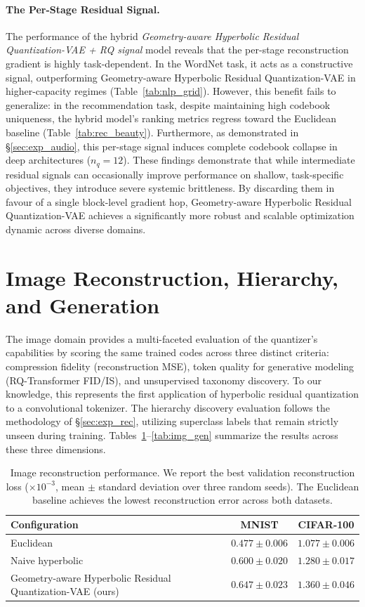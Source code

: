 \documentclass[12pt]{report}
\begin{document}
\paragraph{The Per-Stage Residual Signal.}
The performance of the hybrid \emph{Geometry-aware Hyperbolic Residual Quantization-VAE + RQ signal} model reveals that the per-stage reconstruction gradient is highly task-dependent. In the WordNet task, it acts as a constructive signal, outperforming Geometry-aware Hyperbolic Residual Quantization-VAE in higher-capacity regimes (Table~\ref{tab:nlp_grid}). However, this benefit fails to generalize: in the recommendation task, despite maintaining high codebook uniqueness, the hybrid model's ranking metrics regress toward the Euclidean baseline (Table~\ref{tab:rec_beauty}). Furthermore, as demonstrated in \S\ref{sec:exp_audio}, this per-stage signal induces complete codebook collapse in deep architectures ($n_q=12$). These findings demonstrate that while intermediate residual signals can occasionally improve performance on shallow, task-specific objectives, they introduce severe systemic brittleness. By discarding them in favour of a single block-level gradient hop, Geometry-aware Hyperbolic Residual Quantization-VAE achieves a significantly more robust and scalable optimization dynamic across diverse domains.

\section{Image Reconstruction, Hierarchy, and Generation}
\label{sec:exp_image}

The image domain provides a multi-faceted evaluation of the quantizer's capabilities by scoring the same trained codes across three distinct criteria: compression fidelity (reconstruction MSE), token quality for generative modeling (RQ-Transformer FID/IS), and unsupervised taxonomy discovery. To our knowledge, this represents the first application of hyperbolic residual quantization to a convolutional tokenizer. The hierarchy discovery evaluation follows the methodology of \S\ref{sec:exp_rec}, utilizing superclass labels that remain strictly unseen during training. Tables~\ref{tab:img_recon}--\ref{tab:img_gen} summarize the results across these three dimensions.

\begin{table}[h]
\centering
\caption{Image reconstruction performance. We report the best validation reconstruction loss ($\times10^{-3}$, mean $\pm$ standard deviation over three random seeds). The Euclidean baseline achieves the lowest reconstruction error across both datasets.}
\label{tab:img_recon}
\begin{tabular}{lcc}
\hline
Configuration & MNIST & CIFAR-100 \\
\hline
Euclidean & $\mathbf{0.477 \pm 0.006}$ & $\mathbf{1.077 \pm 0.006}$ \\
Naive hyperbolic & $0.600 \pm 0.020$ & $1.280 \pm 0.017$ \\
Geometry-aware Hyperbolic Residual Quantization-VAE (ours) & $0.647 \pm 0.023$ & $1.360 \pm 0.046$ \\
\hline
\end{tabular}
\end{table}
\end{document}
